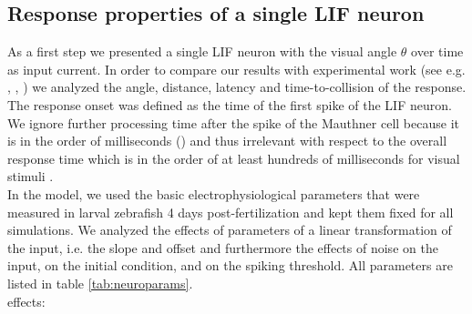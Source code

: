 \documentclass[a4paper,10pt,hidelinks]{scrreprt}
\begin{document}
	\subsection{Response properties of a single LIF neuron}
	As a first step we presented a single LIF neuron with the visual angle 
	$\theta$ over time as input current.
	In order to compare our results with experimental work (see e.g. 
	\cite{Bhattacharyya2017}, \cite{Temizer2015}, \cite{Dunn2016}) we analyzed 
	the angle, distance, latency and time-to-collision of the response.
	The response onset was defined as the time of the first spike of the LIF neuron.
	We ignore further processing time after the spike of the Mauthner cell 
	because it is in the order of milliseconds (\cite{Preuss2003}) and thus 
	irrelevant with respect to the overall response time which is in the order 
	of at least hundreds of milliseconds for visual stimuli 
	\citep{Preuss2006}.\\
	In the model, we used the basic electrophysiological parameters that were measured in larval zebrafish 4 days post-fertilization \citep{Koyama2016} and kept them fixed for all simulations.
	We analyzed the effects of parameters of a linear transformation of the input, i.e. the slope and offset and furthermore the effects of noise on the input, on the initial condition, and on the spiking threshold.
	All parameters are listed in table \ref{tab:neuroparams}.\\
	effects:
\end{document}
